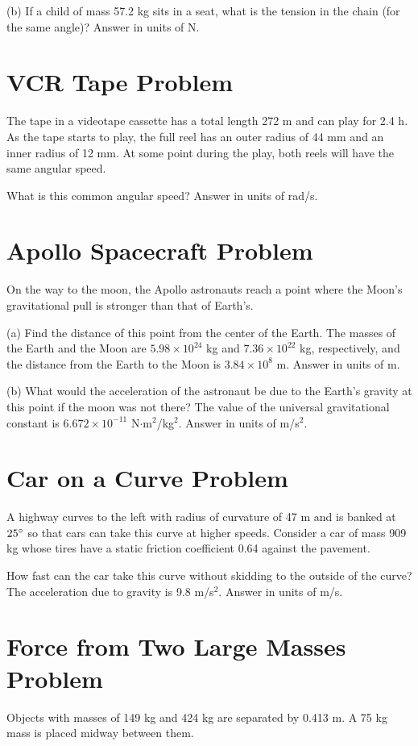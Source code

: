 \documentclass[../physics12.tex]{subfiles}
\begin{document}
(b) If a child of mass 57.2 kg sits in a seat, what is the tension in the chain (for the same angle)?
Answer in units of N.

\section{VCR Tape Problem}
The tape in a videotape cassette has a total length 272 m and can play for 2.4 h. As the tape starts to play, the full reel has an outer radius of 44 mm and an inner radius of 12 mm.
At some point during the play, both reels will have the same angular speed.

What is this common angular speed?
Answer in units of rad/s.

\section{Apollo Spacecraft Problem}
On the way to the moon, the Apollo astronauts reach a point where the Moon's gravitational pull is stronger than that of Earth's.

(a) Find the distance of this point from the center of the Earth. The masses of the Earth and the Moon are $5.98\times 10^{24}$ kg and $7.36\times 10^{22}$ kg, respectively, 
and the distance from the Earth to the Moon is $3.84\times 10^8$ m. 
Answer in units of m.

(b) What would the acceleration of the astronaut be due to the Earth's gravity at this point if the moon was not there? The value of the universal gravitational constant is $6.672\times 10^{-11}$ N$\cdot$m$^2$/kg$^2$.
Answer in units of m/s$^2$.

\section{Car on a Curve Problem}
A highway curves to the left with radius of curvature of 47 m and is banked at $25\degree$ so that cars can take this curve at higher speeds.
Consider a car of mass 909 kg whose tires have a static friction coefficient 0.64 against the pavement.

How fast can the car take this curve without skidding to the outside of the curve? The acceleration due to gravity is 9.8 m/s$^2$.
Answer in units of m/s.

\section{Force from Two Large Masses Problem}
Objects with masses of 149 kg and 424 kg are separated by 0.413 m. A 75 kg mass is placed midway between them.
\end{document}
